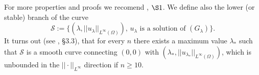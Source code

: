 For more properties and proofs we recomend \cite{stable-solutions-elliptic},
$\S 1$. We define also the lower (or stable) branch of the curve
$$\mathcal S:=\{(\lambda,||u_\lambda||_{L^\infty(\Omega)}),\, u_\lambda\mbox{ is a
    solution of }(G_\lambda)\}.
$$
It turns out (see \cite{stable-solutions-elliptic}, \S 3.3), that for every $n$
there exists a maximum value $\lambda_\ast$ such that $\mathcal{S}$
is a smooth curve connecting $(0,0)$ with $(\lambda_\ast,
||u_{\lambda_\ast}||_{L^\infty(\Omega)})$, which is unbounded in the $||\cdot
||_{L^\infty}$ direction if $n\geq 10$.

